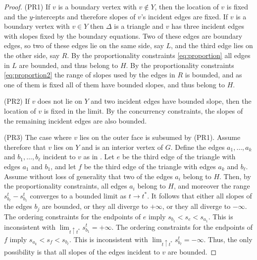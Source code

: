 	\begin{proof}
 (PR1) If $v$ is a boundary vertex with $v\not\in Y$, then
the location of $v$ is fixed and the $y$-intercepts and therefore slopes of
$v$'s incident edges are fixed.  If $v$ is a boundary vertex with $v\in Y$ 
then $\Delta$ is a triangle and $v$ has three incident edges with slopes 
fixed by the boundary equations. Two of these edges are boundary edges, 
so two of these edges lie on the same side, say $L$, and the third edge 
lies on the other side, say $R$. By the proportionality constraints \eqref{eq:proportion}
all edges in $L$ are bounded, and thus belong to $H$. By the 
proportionality constraints \eqref{eq:proportion2} the range of slopes used by the edges in 
$R$ is bounded, and as one of them is fixed all of them have bounded 
slopes, and thus belong to $H$.

		(PR2)	If $v$ does not lie on $Y$ and two incident edges have bounded slope, then the location of $v$ is fixed in the limit.
		By the concurrency constraints, the slopes of the remaining incident
edges are also bounded.

(PR3) The case where $v$ lies on the outer face is subsumed by (PR1).
Assume therefore that $v$ lies on $Y$ and is an interior vertex of $G$.  Define the edges $a_1,\ldots,a_k$
		and $b_1,\ldots,b_\ell$ incident to $v$ as in .  Let $e$ be the third edge of the triangle with edges $a_1$ and $b_1$, and let
		$f$ be the third edge of the triangle with edges $a_k$ and $b_\ell$.
		Assume without loss of generality that two of the edges $a_i$ belong to $H$. Then, by the proportionality constraints, all edges $a_i$ belong to $H$, and moreover the range $s_{b_\ell}^t-s_{b_1}^t$ converges to a bounded limit as $t\to t^*$.  It follows that either all slopes of the edges $b_j$ are bounded, or they all diverge to $+\infty$,
		or they all diverge to $-\infty$. The ordering constraints for the
		endpoints of $e$ imply \begin{math}
		s_{b_1}<s_e<s_{a_1}
		\end{math}.
		This is inconsistent with $\lim_{t\uparrow t^*} s_{b_1}^t=+\infty$.
		The ordering constraints for the endpoints of $f$ imply
		\begin{math}
		s_{a_k}<s_f<s_{b_\ell}
		\end{math}.
		This is inconsistent with $\lim_{t\uparrow t^*} s_{b_\ell}^t=-\infty$. Thus, the only
		possibility is that all slopes of the edges incident to $v$ are bounded.
		

\end{proof}
